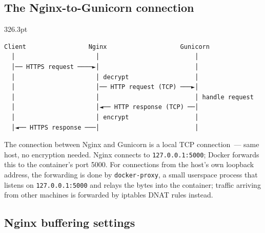 \subsection*{The Nginx-to-Gunicorn connection}\label{26-network-stack-flow:the-nginx-to-gunicorn-connection}

\begin{diagrambox}[short]{326.3pt}
\begin{Verbatim}[fontsize=\fontsize{9.0}{8.55}\selectfont]
Client                 Nginx                    Gunicorn
  │                      │                          │
  │── HTTPS request ────►│                          │
  │                      │ decrypt                  │
  │                      │── HTTP request (TCP) ───►│
  │                      │                          │ handle request
  │                      │◄── HTTP response (TCP) ──│
  │                      │ encrypt                  │
  │◄── HTTPS response ───│                          │
\end{Verbatim}
\end{diagrambox}

\noindent{}The connection between Nginx and Gunicorn is a local TCP connection~--- same host, no encryption needed. Nginx connects to \texttt{127.0.0.1:5000}; Docker forwards this to the container's port 5000. For connections from the host's own loopback address, the forwarding is done by \texttt{docker-proxy}, a small userspace process that listens on \texttt{127.0.0.1:5000} and relays the bytes into the container; traffic arriving from other machines is forwarded by iptables DNAT rules instead.

\subsection*{Nginx buffering settings}\label{26-network-stack-flow:nginx-buffering-settings}

\begin{codebox}[short]

\begin{Shaded}
\begin{Highlighting}[]

\end{Highlighting}
\end{Shaded}

\end{codebox}

